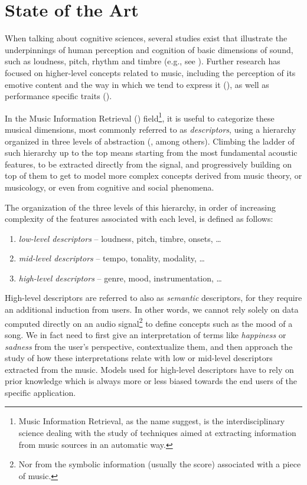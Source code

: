 \chapter{State of the Art}\label{ch:sota}
When talking about cognitive sciences, several studies exist that illustrate the underpinnings of human perception and cognition of basic dimensions of sound, such as loudness, pitch, rhythm and timbre (e.g., see \cite{justus2002music}). Further research has focused on higher-level concepts related to music, including the perception of its emotive content and the way in which we tend to express it (\cite{juslin2004expression}), as well as performance specific traits (\cite{palmer1997music}).

In the Music Information Retrieval () field\footnote{Music Information Retrieval, as the name suggest, is the interdisciplinary science dealing with the study of techniques aimed at extracting information from music sources in an automatic way.}, it is useful to categorize these musical dimensions, most commonly referred to as \emph{descriptors}, using a hierarchy organized in three levels of abstraction (\cite{gouyon2008content}, among others). Climbing the ladder of such hierarchy up to the top means starting from the most fundamental acoustic features, to be extracted directly from the signal, and progressively building on top of them to get to model more complex concepts derived from music theory, or musicology, or even from cognitive and social phenomena.

The organization of the three levels of this hierarchy, in order of increasing complexity of the features associated with each level, is defined as follows:

\begin{enumerate}
	\item \emph{low-level descriptors} -- loudness, pitch, timbre, onsets, \ldots
	\item \emph{mid-level descriptors} -- tempo, tonality, modality, \ldots
	\item \emph{high-level descriptors} -- genre, mood, instrumentation, \ldots
\end{enumerate}

High-level descriptors are referred to also as \emph{semantic} descriptors, for they require an additional induction from users. In other words, we cannot rely solely on data computed directly on an audio signal\footnote{Nor from the symbolic information (usually the score) associated with a piece of music.} to define concepts such as the mood of a song. We in fact need to first give an interpretation of terms like \emph{happiness} or \emph{sadness} from the user's perspective, contextualize them, and then approach the study of how these interpretations relate with low or mid-level descriptors extracted from the music. Models used for high-level descriptors have to rely on prior knowledge which is always more or less biased towards the end users of the specific application.

